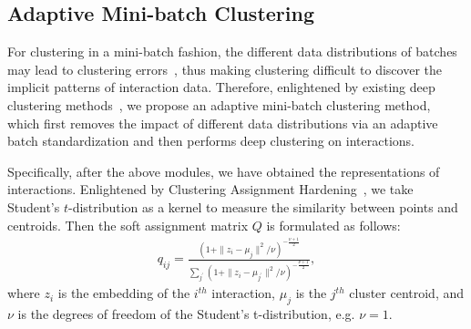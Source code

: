 \documentclass[11pt]{article}
\begin{document}
\subsection{Adaptive Mini-batch Clustering}    \label{mod:batch}
For clustering in a mini-batch fashion, the different data distributions of batches may lead to clustering errors~\cite{yan_deep_2015}, thus making clustering difficult to discover the implicit patterns of interaction data. Therefore, enlightened by existing deep clustering methods~\cite{xie_unsupervised_2016}, we propose an adaptive mini-batch clustering method, which first removes the impact of different data distributions via an adaptive batch standardization and then performs deep clustering on interactions.

Specifically, after the above modules, we have obtained the representations of interactions. Enlightened by Clustering Assignment Hardening~\cite{xie_unsupervised_2016}, we take Student's $t$-distribution as a kernel to measure the similarity between points and centroids.
Then the soft assignment matrix $Q$ is formulated as follows:
\begin{align}
	q_{i j}=\frac{(1+\|z_{i}-\mu_{j}\|^{2} / \nu)^{-\frac{\nu+1}{2}}}{\sum_{j^{\prime}}(1+\|z_{i}-\mu_{j^{\prime}}\|^{2} / \nu)^{-\frac{\nu+1}{2}}} ,
\end{align}
where $z_{i}$ is the embedding of the $i^{th}$ interaction, $\mu_{j}$ is the $j^{th}$ cluster centroid, and $\nu$ is the degrees of freedom of the Student’s t-distribution, e.g. $\nu=1$.
\end{document}
